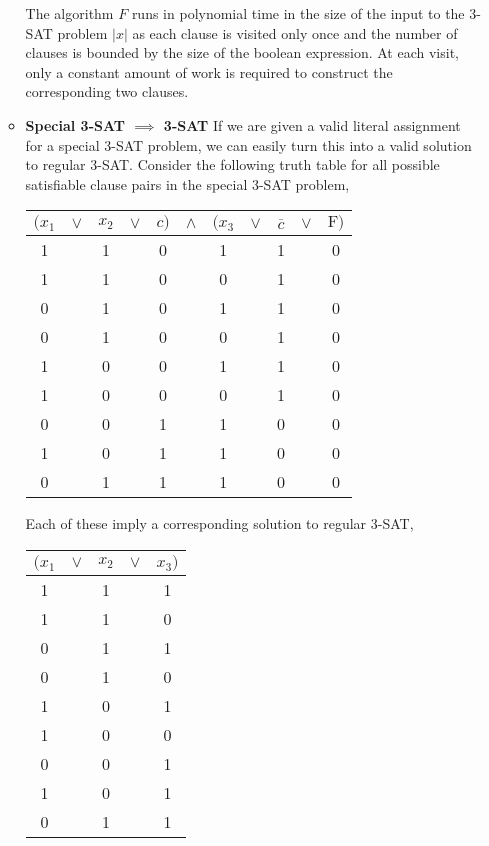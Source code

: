 \documentclass[12pt,twoside]{article}
\begin{document}
\begin{problems}
\begin{problemparts}
\begin{itemize}
\begin{itemize}
    The algorithm $F$ runs in polynomial time in the size of the input to the
    3-SAT problem $|x|$ as each clause is visited only once and the number of
    clauses is bounded by the size of the boolean expression. At each visit,
    only a constant amount of work is required to construct the corresponding
    two clauses.

    \item {\bf Special 3-SAT $\implies$ 3-SAT} If we are given a valid
    literal assignment for a special 3-SAT problem, we can easily turn this
    into a valid solution to regular 3-SAT. Consider the following truth
    table for all possible satisfiable clause pairs in the special 3-SAT
    problem,

    \begin{center}
      \begin{tabular}{c c c c c c c c c c c}
        $(x_1$ & $\lor$ & $x_2$ & $\lor$ & $c)$ & $\land$ & $(x_3$ & $\lor$ &
        $\overline{c}$ & $\lor$ & $\mathrm{F})$ \\
        \hline \hline
        1 && 1 && 0 && 1 && 1 && 0 \\
        1 && 1 && 0 && 0 && 1 && 0 \\
        0 && 1 && 0 && 1 && 1 && 0 \\
        0 && 1 && 0 && 0 && 1 && 0 \\
        1 && 0 && 0 && 1 && 1 && 0 \\
        1 && 0 && 0 && 0 && 1 && 0 \\
        0 && 0 && 1 && 1 && 0 && 0 \\
        1 && 0 && 1 && 1 && 0 && 0 \\
        0 && 1 && 1 && 1 && 0 && 0
      \end{tabular}
    \end{center}

    Each of these imply a corresponding solution to regular 3-SAT,

    \begin{center}
      \begin{tabular}{c c c c c}
        $(x_1$ & $\lor$ & $x_2$ & $\lor$ & $x_3)$ \\
        \hline \hline
        1 && 1 && 1 \\
        1 && 1 && 0 \\
        0 && 1 && 1 \\
        0 && 1 && 0 \\
        1 && 0 && 1 \\
        1 && 0 && 0 \\
        0 && 0 && 1 \\
        1 && 0 && 1 \\
        0 && 1 && 1 
      \end{tabular}
    \end{center}


\end{itemize}
\end{itemize}
\end{problemparts}
\end{problems}
\end{document}

